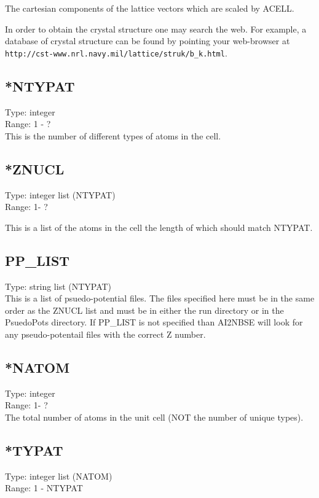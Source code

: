 \documentclass[12pt]{article}
\begin{document}
The cartesian components of the lattice vectors which are scaled by ACELL.

In order to obtain the crystal structure one may search the web. For example,
a database of crystal structure can be found by pointing your web-browser at
 \verb|http://cst-www.nrl.navy.mil/lattice/struk/b_k.html|.

\subsection{*NTYPAT}
Type: integer \\
Range: 1 - ? \\

This is the number of different types of atoms in the cell.

\subsection{*ZNUCL}
Type: integer list (NTYPAT) \\
Range: 1- ?

This is a list of the atoms in the cell the length of which should match NTYPAT. 
\subsection{PP\_LIST}
Type: string list (NTYPAT) \\

This is a list of psuedo-potential files. The files specified here must be in the same order as the ZNUCL list and must be in either the run directory or in the PsuedoPots directory. If PP\_LIST is not specified than \textsc{AI2NBSE} will look for any pseudo-potentail files with the correct Z number.


\subsection{*NATOM}
Type: integer \\
Range: 1- ? \\

The total number of atoms in the unit cell (NOT the number of unique types).

\subsection{*TYPAT}
Type: integer list (NATOM) \\
Range: 1 - NTYPAT \\
\end{document}

